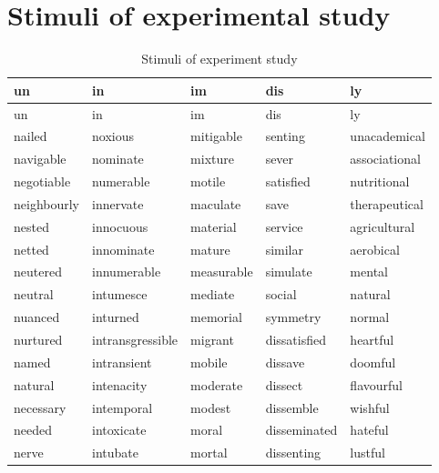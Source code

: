 \chapter{Stimuli of experimental study} \label{Appendix E: Stimuli of Experimental Study}
{\footnotesize\begin{longtabu} to \textwidth {XXXXX}
\caption{Stimuli of experiment study\label{Stimuli of Experiment Study}}\\
\lsptoprule un    & {in}      & {im}     & {dis}   & {ly}     \\\midrule\endfirsthead
\midrule un    & {in}      & {im}     & {dis}   & {ly}     \\\midrule\endhead
\endfoot\lspbottomrule\endlastfoot
	nailed        & noxious          & mitigable       & senting        & unacademical    \\
	navigable     & nominate         & mixture         & sever          & associational   \\
	negotiable    & numerable        & motile          & satisfied      & nutritional     \\
	neighbourly   & innervate        & maculate        & save           & therapeutical   \\
	nested        & innocuous        & material        & service        & agricultural    \\
					netted        & innominate       & mature          & similar        & aerobical       \\
					neutered      & innumerable      & measurable      & simulate       & mental          \\
	neutral       & intumesce        & mediate         & social         & natural         \\
	nuanced       & inturned         & memorial        & symmetry       & normal          \\		
				nurtured      & intransgressible & migrant         & dissatisfied   & heartful        \\
				named         & intransient      & mobile          & dissave        & doomful         \\
				natural       & intenacity       & moderate        & dissect        & flavourful      \\
				necessary     & intemporal       & modest          & dissemble      & wishful         \\
				needed        & intoxicate       & moral           & disseminated   & hateful         \\
				nerve         & intubate         & mortal          & dissenting     & lustful         \\

\end{longtabu}}
